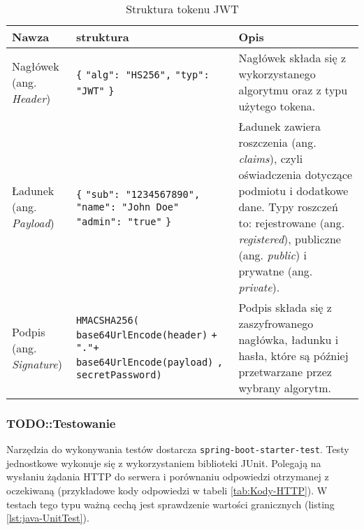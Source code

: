 \begin{longtable}{|p{3cm}|p{5cm}|p{6cm}|}
		\caption{Struktura tokenu JWT \cite{JWT}}
		\label{tab:JWT} \\
\hline
\textbf{Nawza} & \textbf{struktura} & \textbf{Opis} \\ \hline

Nagłówek (ang. \textit{Header}) &
 \texttt{\{} \newline
 \hspace*{1em}\texttt{"alg": "HS256",} \newline
 \hspace*{1em}\texttt{"typ": "JWT"} \newline
 \texttt{\}} & 
 Nagłówek składa się z wykorzystanego algorytmu oraz z typu użytego tokena. \\ \hline
 Ładunek (ang. \textit{Payload}) &
  \texttt{\{} \newline
 \hspace*{1em}\texttt{"sub": "1234567890",} \newline
 \hspace*{1em}\texttt{"name": "John Doe"} \newline
 \hspace*{1em}\texttt{"admin": "true"} \newline
 \texttt{\}} & 
 Ładunek zawiera roszczenia (ang. \textit{claims}), czyli oświadczenia dotyczące podmiotu i dodatkowe dane. Typy roszczeń to: rejestrowane (ang. \textit{registered}), publiczne (ang. \textit{public}) i prywatne (ang. \textit{private}).
 \\ \hline
  Podpis (ang. \textit{Signature}) &
\texttt{HMACSHA256(} \newline
 \hspace*{1em}\texttt{base64UrlEncode(header)} \newline
 \hspace*{1em}\texttt{+ "."\space +} \newline
 \hspace*{1em}\texttt{base64UrlEncode(payload)} \newline
 \hspace*{1em}\texttt{, secretPassword)} &
  Podpis składa się z zaszyfrowanego nagłówka, ładunku i hasła, które są później przetwarzane przez wybrany algorytm. 
 \\ \hline

\end{longtable}

\subsubsection*{TODO::Testowanie}
Narzędzia do wykonywania testów dostarcza \texttt{spring-boot-starter-test}. Testy jednostkowe wykonuje się z wykorzystaniem biblioteki JUnit. Polegają na wysłaniu żądania HTTP do serwera i porównaniu odpowiedzi otrzymanej z oczekiwaną (przykładowe kody odpowiedzi w tabeli \ref{tab:Kody-HTTP}). W testach tego typu ważną cechą jest sprawdzenie wartości granicznych (listing \ref{lst:java-UnitTest}). 

